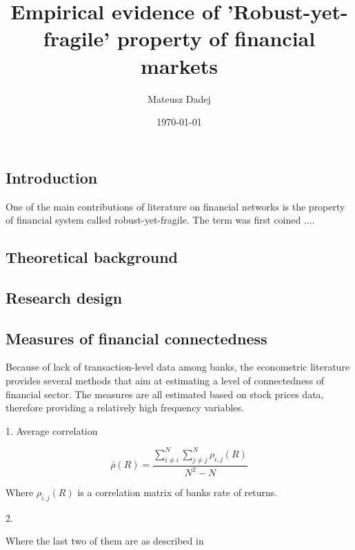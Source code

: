\documentclass{article}
\title{Empirical evidence of 'Robust-yet-fragile' property of financial markets}
\author{Mateusz Dadej}
\date{\today}
\begin{document}
\maketitle

\subsection*{Introduction}

One of the main contributions of literature on financial networks is the property of financial system called robust-yet-fragile. The term was first coined ....


\subsection*{Theoretical background}

\subsection*{Research design}

\subsection*{Measures of financial connectedness}

Because of lack of transaction-level data among banks, the econometric literature provides several methods that aim at estimating a level of connectedness of financial sector. The measures are all estimated based on stock prices data, therefore providing a relatively high frequency variables. 

1. Average correlation 

\[\bar{\rho}(R) = \frac{\sum_{i \neq i}^{N} \sum_{j \neq j}^{N} \rho_{i,j}(R)}{N^2-N}\]

Where $\rho_{i,j}(R)$ is a correlation matrix of banks rate of returns.

2. 


Where the last two of them are as described in \citet{billio}

\subsection*{}


\end{document}
